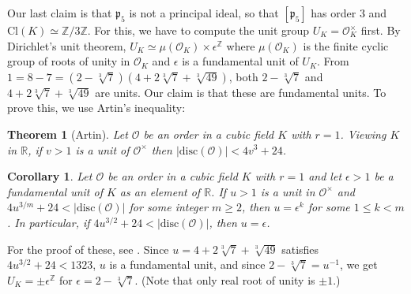 \documentclass{article}
\newtheorem{theorem}{Theorem}
\newtheorem{corollary}{Corollary}
\newcommand{\Cl}{\mathrm{Cl}}
\begin{document}
Our last claim is that $\mathfrak{p}_{5}$ is not a principal ideal, so that $[\mathfrak{p}_{5}]$ has order 3 and $\Cl(K)\simeq \mathbb{Z}/3\mathbb{Z}$. 
For this, we have to compute the unit group $U_{K} = \mathcal{O}_{K}^{\times}$ first. By Dirichlet's unit theorem, $U_{K} \simeq \mu(\mathcal{O}_{K})\times \epsilon^{\mathbb{Z}}$ where $\mu(\mathcal{O}_{K})$ is the finite cyclic group of roots of unity in $\mathcal{O}_{K}$ and $\epsilon$ is a fundamental unit of $U_{K}$. 
From $1 = 8 - 7  = (2-\sqrt[3]{7})(4 + 2\sqrt[3]{7} + \sqrt[3]{49})$, both $2-\sqrt[3]{7}$ and $4+2\sqrt[3]{7} + \sqrt[3]{49}$ are units. 
Our claim is that these are fundamental units. To prove this, we use Artin's inequality:
\begin{theorem}[Artin]
Let $\mathcal{O}$ be an order in a cubic field $K$ with $r = 1$. Viewing $K$ in $\mathbb{R}$, if $v>1$ is a unit of $\mathcal{O}^{\times}$ then $|\mathrm{disc}(\mathcal{O})| < 4v^{3} + 24$. 
\end{theorem}

\begin{corollary}
Let $\mathcal{O}$ be an order in a cubic field $K$ with $r=1$ and let $\epsilon >1$ be a fundamental unit of $K$ as an element of $\mathbb{R}$. If $u>1$ is a unit in $\mathcal{O}^{\times}$ and $4u^{3/m} + 24 < |\mathrm{disc}(\mathcal{O})|$ for some integer $m\geq 2$, then $u = \epsilon^{k}$ for some $1\leq k < m$. In particular, if $4u^{3/2} + 24 < |\mathrm{disc}(\mathcal{O})|$, then $u = \epsilon$. 
\end{corollary}
For the proof of these, see \cite{condir}. 
Since $u = 4 + 2\sqrt[3]{7} + \sqrt[3]{49}$ satisfies $4u^{3/2} + 24 < 1323$, $u$ is a fundamental unit, and since $2-\sqrt[3]{7} = u^{-1}$, we get $U_{K} = \pm \epsilon^{\mathbb{Z}}$ for $\epsilon = 2 - \sqrt[3]{7}$. (Note that only real root of unity is $\pm 1$.) 
\end{document}
